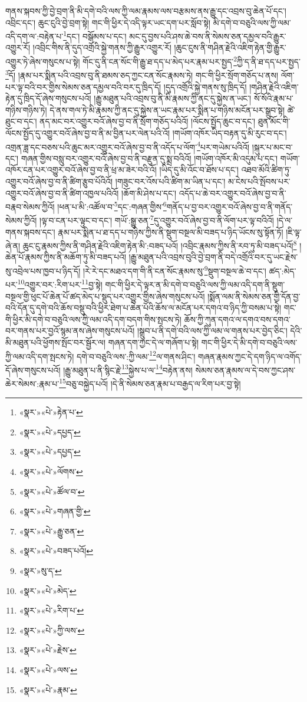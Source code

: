 གནས་སྐབས་ཀྱི་བྱེ་བྲག་ནི་མི་དགེ་བའི་ལས་ཀྱི་ལམ་རྣམས་ལས་བརྩམས་ནས་རྒྱུ་དང་འབྲས་བུ་ཆེན་པོ་དང་། འབྲིང་དང་། ཆུང་ངུའི་བྱེ་བྲག་སྟེ། གང་གི་ཕྱིར་དེ་འདི་ལྟར་ཡང་དག་པར་སློབ་སྟེ། མི་དགེ་བ་བཅུའི་ལས་ཀྱི་ལམ་འདི་དག་ལ་:བརྟེན་པ་\footnote{«སྣར་»«པེ་»རྟེན་པ་}དང་། བསྒོམས་པ་དང་། མང་དུ་བྱས་པའི་ཤས་ཆེ་བས་ནི་སེམས་ཅན་དམྱལ་བའི་རྒྱུར་འགྱུར་རོ། །འབྲིང་གིས་ནི་དུད་འགྲོའི་སྐྱེ་གནས་ཀྱི་རྒྱུར་འགྱུར་རོ། །ཆུང་ངུས་ནི་གཤིན་རྗེའི་འཇིག་རྟེན་གྱི་རྒྱུར་འགྱུར་ཏེ་ཞེས་གསུངས་པ་སྟེ། གོང་དུ་ནི་ངན་སོང་གི་རྒྱུ་ཐ་དད་པ་མེད་པར་རྣམ་པར་སྤྱད་\footnote{«སྣར་»«པེ་»དཔྱད་}ཀྱི་ད་ནི་ཐ་དད་པར་སྤྱད་\footnote{«སྣར་»«པེ་»དཔྱད་}དོ། །རྣམ་པར་སྨིན་པའི་འབྲས་བུ་ནི་ཐམས་ཅད་ཀྱང་ངན་སོང་རྣམས་ཏེ། གང་གི་ཕྱིར་སྲོག་གཅོད་པ་ནས། ལོག་པར་ལྟ་བའི་བར་གྱིས་སེམས་ཅན་དམྱལ་བའི་བར་དུ་ཁྲིད་དོ། །དུད་འགྲོའི་སྐྱེ་གནས་སུ་ཁྲིད་དོ། །གཤིན་རྗེའི་འཇིག་རྟེན་དུ་ཁྲིད་དོ་ཞེས་གསུངས་པའོ། །རྒྱུ་མཐུན་པའི་འབྲས་བུ་ནི་མི་རྣམས་ཀྱི་ནང་དུ་སྐྱེས་ན་ཡང་། སོ་སོའི་རྣམ་པ་གཉིས་གཉིས་ཏེ། དེ་ནས་གལ་ཏེ་མི་རྣམས་ཀྱི་ནང་དུ་སྐྱེས་ན་ཡང་རྣམ་པར་སྨིན་པ་གཉིས་མངོན་པར་སྒྲུབ་སྟེ། ཚེ་ཐུང་བ་དང་། ནད་མང་བར་འགྱུར་བའོ་ཞེས་བྱ་བ་ནི་སྲོག་གཅོད་པའིའོ། །ལོངས་སྤྱོད་ཆུང་བ་དང་། ཐུན་མོང་གི་ལོངས་སྤྱོད་དུ་འགྱུར་བའོ་ཞེས་བྱ་བ་ནི་མ་བྱིན་པར་ལེན་པའི་འོ། །གཡོག་འཁོར་ཡིད་བརྟན་དུ་མི་རུང་བ་དང་། འགྲན་ཟླ་དང་བཅས་པའི་ཆུང་མར་འགྱུར་བའོ་ཞེས་བྱ་བ་ནི་འདོད་པ་ལོག་\footnote{«སྣར་»«པེ་»ལོགས་}པར་གཡེམ་པའིའོ། །སྐུར་པ་མང་བ་དང་། གཞན་གྱིས་བསླུ་བར་འགྱུར་བའོ་ཞེས་བྱ་བ་ནི་བརྫུན་དུ་སྨྲ་བའིའོ། །གཡོག་འཁོར་མི་འདུམ་པ་དང་། གཡོག་འཁོར་ངན་པར་འགྱུར་བའོ་ཞེས་བྱ་བ་ནི་ཕྲ་མ་ཟེར་བའི་འོ། །ཡིད་དུ་མི་འོང་བ་ཐོས་པ་དང་། འཐབ་མོའི་ཚིག་ཏུ་འགྱུར་བའོ་ཞེས་བྱ་བ་ནི་ཚིག་རྩུབ་པོའིའོ། །གཟུང་བར་འོས་པའི་ཚིག་མ་ཡིན་པ་དང་། མ་ངེས་པའི་སྤོབས་པར་འགྱུར་བའོ་ཞེས་བྱ་བ་ནི་ཚིག་འཁྱལ་པའིའོ། །ཆོག་མི་ཤེས་པ་དང་། འདོད་པ་ཆེ་བར་འགྱུར་བའོ་ཞེས་བྱ་བ་ནི་བརྣབ་སེམས་ཀྱིའོ། །ཕན་པ་མི་:འཚོལ་བ་\footnote{«སྣར་»«པེ་»ཚོལ་བ་}དང་:གཞན་གྱིས་\footnote{«སྣར་»«པེ་»གཞན་གྱི་}གནོད་པ་བྱ་བར་འགྱུར་བའོ་ཞེས་བྱ་བ་ནི་གནོད་སེམས་ཀྱིའོ། །ལྟ་བ་ངན་པར་ལྟུང་བ་དང་། གཡོ་:སྒྱུ་ཅན་\footnote{«སྣར་»«པེ་»རྒྱུ་ཅན་}དུ་འགྱུར་བའོ་ཞེས་བྱ་བ་ནི་ལོག་པར་ལྟ་བའིའོ། །དེ་ལ་གནས་སྐབས་དང་། རྣམ་པར་སྨིན་པ་ཐ་དད་པ་གཉིས་ཀྱིས་ནི་སྡུག་བསྔལ་མི་བཟད་པ་ཉིད་ཡོངས་སུ་སྟོན་ཏོ། །ཇི་ལྟ་ཞེ་ན། ཆུང་ངུ་རྣམས་ཀྱིས་ནི་གཤིན་རྗེའི་འཇིག་རྟེན་མི་:བཟད་པའོ། །འབྲིང་རྣམས་ཀྱིས་ནི་རབ་ཏུ་མི་བཟད་པའོ།\footnote{«སྣར་»«པེ་»བཟད་པའོ།} །ཆེན་པོ་རྣམས་ཀྱིས་ནི་མཆོག་ཏུ་མི་བཟད་པའོ། །རྒྱུ་མཐུན་པའི་འབྲས་བུའི་བྱེ་བྲག་ནི་བདེ་འགྲོའི་བར་དུ་ཡང་རྗེས་སུ་འབྲེལ་པས་ཁྱབ་པ་ཉིད་དོ། །རེ་རེ་དང་མཐའ་དག་གི་ནི་ངན་སོང་རྣམས་སུ་\footnote{«སྣར་»སུ་ད་}སྡུག་བསྔལ་ཆེ་བ་དང་། ཚད་:མེད་པར་\footnote{«སྣར་»«པེ་»མེད་}འགྱུར་བར་:རིག་པར་\footnote{«སྣར་»«པེ་»རིག་པ་}བྱ་སྟེ། གང་གི་ཕྱིར་དེ་ལྟར་ན་མི་དགེ་བ་བཅུའི་ལས་ཀྱི་ལམ་འདི་དག་ནི་སྡུག་བསྔལ་གྱི་ཕུང་པོ་ཆེན་པོ་ཚད་མེད་པ་སྡུད་པར་འགྱུར་གྱིས་ཞེས་གསུངས་པའོ། །སྨོན་ལམ་ནི་སེམས་ཅན་གྱི་དོན་བྱ་བའི་དོན་དུ་དགེ་བའི་ཆོས་བསྡུ་བའི་ཕྱིར་ཐེག་པ་ཆེན་པོའི་ཆོས་ལ་མངོན་པར་དགའ་བ་ཉིད་ཀྱི་བསམ་པ་སྟེ། གང་གི་ཕྱིར་མི་དགེ་བ་བཅུའི་ལས་ཀྱི་ལམ་འདི་དག་བདག་གིས་སྤངས་ཏེ། ཆོས་ཀྱི་ཀུན་དགའ་ལ་དགའ་བས་དགའ་བར་གནས་པར་བྱའོ་སྙམ་ནས་ཞེས་གསུངས་པའོ། །སྒྲུབ་པ་ནི་དགེ་བའི་ལས་ཀྱི་ལམ་ལ་གནས་པར་བྱེད་ཅིང་། དེའི་མི་མཐུན་པའི་ཕྱོགས་སྤོང་བར་སྦྱོར་ལ། གཞན་དག་ཀྱང་དེ་ལ་གཞོག་པ་སྟེ། གང་གི་ཕྱིར་དེ་མི་དགེ་བ་བཅུའི་ལས་ཀྱི་ལམ་འདི་དག་སྤངས་ཏེ། དགེ་བ་བཅུའི་ལས་:ཀྱི་ལམ་\footnote{«སྣར་»«པེ་»ཀྱི་ལས་}ལ་གནས་ཤིང་། གཞན་རྣམས་ཀྱང་དེ་དག་ཉིད་ལ་འགོད་དོ་ཞེས་གསུངས་པའོ། །རྒྱུ་མཐུན་པ་ནི་སྙིང་རྗེ་\footnote{«སྣར་»«པེ་»རྗེས་}སྐྱེས་པ་ལ་\footnote{«སྣར་»«པེ་»ལས་}བརྟེན་ནས། སེམས་ཅན་རྣམས་ལ་དེ་བས་ཀྱང་ཤས་ཆེར་སེམས་:རྣམ་པ་\footnote{«སྣར་»«པེ་»རྣམ་}བཅུ་བསྐྱེད་པའོ། །དེ་ནི་སེམས་ཅན་རྣམ་པ་བརྒྱད་ལ་རིག་པར་བྱ་སྟེ། 